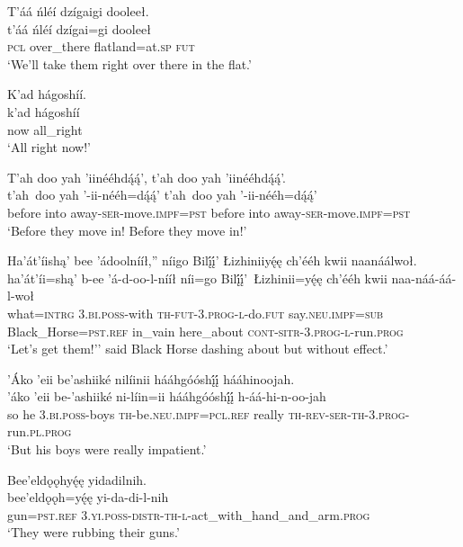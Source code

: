 \ea\label{ex:text1-47-2}
T’áá ńléí dzígaigi dooleeł.\\
\gll t’áá	ńléí	dzígai=gi	dooleeł\\
     \textsc{pcl}	over\_there	flatland=at.\textsc{sp}	\textsc{fut}\\
\glt `We’ll take them right over there in the flat.'
\z

\ea\label{ex:text1-47-3}
K’ad hágoshíí.\\
\gll k’ad	hágoshíí\\
     now	all\_right\\
\glt `All right now!'
\z

\ea\label{ex:text1-47-4}
T’ah doo yah ’iinééhdą́ą́’, t’ah doo yah ’iinééhdą́ą́’.\\
\gll t’ah~{doo}	yah	’-ii-nééh=dą́ą́’	t’ah~{doo}	yah	’-ii-nééh=dą́ą́’\\
     before	into	away-\textsc{ser}-move.\textsc{impf}=\textsc{pst}	before	into	away-\textsc{ser}-move.\textsc{impf}=\textsc{pst}\\
\glt `Before they move in! Before they move in!'
\z

\ea\label{ex:text1-47-5}
Ha’át’íishą’ bee ’ádoolnííł,'' níigo Bilį́į́’ Łizhiniiyę́ę ch’ééh kwii naanáálwoł.\\
\gll ha’át’íi=shą’	b-ee	’á-d-oo-l-nííł	níi=go	Bilį́į́’~{Łizhinii=yę́ę}	ch’ééh	kwii	naa-náá-áá-l-woł\\
     what=\textsc{intrg}	3.\textsc{bi}.\textsc{poss}-with	\textsc{th}-\textsc{fut}-3.\textsc{prog}-\textsc{l}-do.\textsc{fut}	say.\textsc{neu}.\textsc{impf}=\textsc{sub}	Black\_Horse=\textsc{pst}.\textsc{ref}	in\_vain	here\_about	\textsc{cont}-\textsc{sitr}-3.\textsc{prog}-\textsc{l}-run.\textsc{prog}\\
\glt `Let's get them!'' said Black Horse dashing about but without effect.'
\z

\ea\label{ex:text1-48-1}
’Áko ’eii be’ashiiké nilíinii hááhgóóshį́į́ hááhinoojah.\\
\gll ’áko	’eii	be-’ashiiké	ni-líin=ii	hááhgóóshį́į́	h-áá-hi-n-oo-jah\\
     so	he	3.\textsc{bi}.\textsc{poss}-boys	\textsc{th}-be.\textsc{neu}.\textsc{impf}=\textsc{pcl}.\textsc{ref}	really	\textsc{th}-\textsc{rev}-\textsc{ser}-\textsc{th}-3.\textsc{prog}-run.\textsc{pl}.\textsc{prog}\\
\glt `But his boys were really impatient.'
\z

\ea\label{ex:text1-48-2}
Bee’eldǫǫhyę́ę yidadilnih.\\
\gll bee’eldǫǫh=yę́ę	yi-da-di-l-nih\\
     gun=\textsc{pst}.\textsc{ref}	3.\textsc{yi}.\textsc{poss}-\textsc{distr}-\textsc{th}-\textsc{l}-act\_with\_hand\_and\_arm.\textsc{prog}\\
\glt `They were rubbing their guns.'
\z

